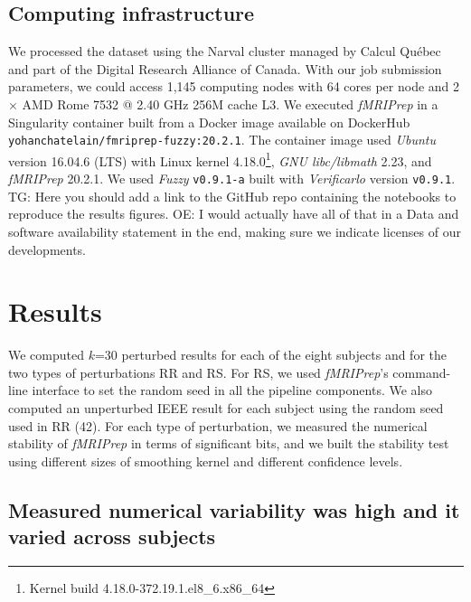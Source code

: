 \documentclass[lettersize,journal]{IEEEtran}
\newcommand{\TG}[1]{\color{orange}\textsc{TG:} #1\color{black}\xspace}
\newcommand{\oesteban}[1]{\color{orange}\textsc{OE:} #1\color{black}\xspace}
\newcommand{\fmriprep}{\emph{fMRIPrep}\xspace}
\begin{document}
\subsection{Computing infrastructure}
We processed the dataset using the Narval cluster managed by Calcul Qu\'ebec and part of the Digital Research Alliance of Canada.
With our job submission parameters, we could access 1,145 computing nodes with 64 cores per node and 2 $\times$ AMD Rome 7532 @ 2.40 GHz 256M cache L3. We executed \fmriprep in a Singularity container built from a Docker image available on DockerHub \texttt{yohanchatelain/fmriprep-fuzzy:20.2.1}.
The container image used \emph{Ubuntu} version 16.04.6 (LTS) with Linux kernel 4.18.0\footnote{Kernel build 4.18.0-372.19.1.el8\_6.x86\_64}, \emph{GNU libc/libmath} 2.23, and \fmriprep 20.2.1.
We used \emph{Fuzzy} \texttt{v0.9.1-a} built with \emph{Verificarlo} version \texttt{v0.9.1}.
\TG{Here you should add a link to the GitHub repo containing the notebooks to reproduce the results figures.}
\oesteban{I would actually have all of that in a Data and software availability statement in the end, making sure we indicate licenses of our developments.}

\section{Results}

We computed $k$=30 perturbed results for each of the eight subjects and for the two types of perturbations RR and RS. For RS, we used \fmriprep's command-line interface to set the random seed in all the pipeline components. We also computed an unperturbed IEEE result for each subject using the random seed used in RR (42). For each type of perturbation, we measured the numerical stability of \fmriprep in terms of significant bits, and we built the stability test using different sizes of smoothing kernel and different confidence levels.

\subsection{Measured numerical variability was high and it varied across subjects}
\end{document}
